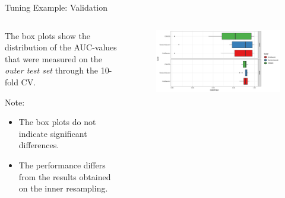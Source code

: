 \begin{frame}{Tuning Example: Validation}

\begin{columns}
\begin{column}{0.3\textwidth}
  \footnotesize

  The box plots show the distribution of the AUC-values that were measured on the \emph{outer test set} through the 10-fold CV.

  Note:

  \begin{itemize}
    \item The box plots do not indicate significant differences\footnotemark.
    \item The performance differs from the results obtained on the inner resampling.
  \end{itemize}

\end{column}
\begin{column}{0.7\textwidth}
  \begin{center}
  \begin{figure}
  \includegraphics[width=\textwidth]{images/benchmark_boxplot_tuners.png}
  \end{figure}
  \end{center}
\end{column}
\end{columns}
\end{frame}

